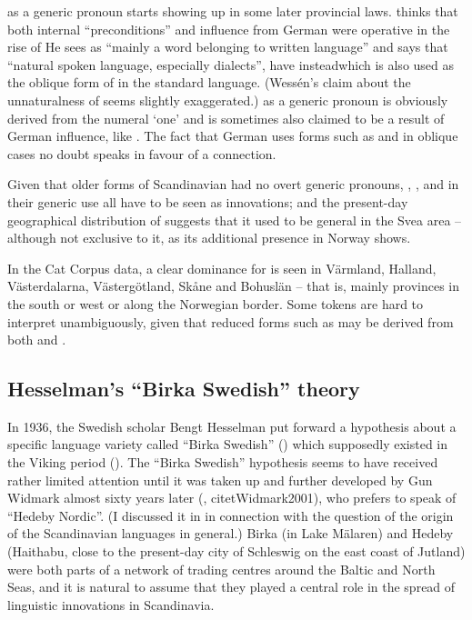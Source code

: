  as a generic pronoun starts showing up in some later provincial laws. \citet[75]{Wessén1956} thinks that both internal “preconditions” and influence from German were operative in the rise of He sees  as “mainly a word belonging to written language” and says that “natural spoken language, especially dialects”, have instead\textstyleLinguisticExample{, }which is also used as the oblique form of  in the standard language. (Wessén’s claim about the unnaturalness of  seems slightly exaggerated.) as a generic pronoun is obviously derived from the numeral ‘one’ and is sometimes also claimed to be a result of German influence, like . The fact that German uses forms such as  and  in oblique cases no doubt speaks in favour of a connection.

Given that older forms of Scandinavian had no overt generic pronouns, , , and  in their generic use all have to be seen as innovations; and the present-day geographical distribution of  suggests that it used to be general in the Svea area – although not exclusive to it, as its additional presence in Norway shows. 

In the Cat Corpus data, a clear dominance for is seen in Värmland, Halland, Västerdalarna, Västergötland, Skåne and Bohuslän – that is, mainly provinces in the south or west or along the Norwegian border. Some tokens are hard to interpret unambiguously, given that reduced forms such as  may be derived from both  and . 

\subsection{Hesselman’s “Birka Swedish” theory}
\label{sec:6.2.5}

In 1936, the Swedish scholar Bengt Hesselman put forward a hypothesis about a specific language variety called “Birka Swedish” () which supposedly existed in the Viking period (\citet{Hesselman1936}). The “Birka Swedish” hypothesis seems to have received rather limited attention until it was taken up and further developed by Gun Widmark almost sixty years later (\citet{Widmark1994}, citet{Widmark2001}), who prefers to speak of “Hedeby Nordic”. (I discussed it in \citet{Dahl2001} in connection with the question of the origin of the Scandinavian languages in general.) Birka (in Lake Mälaren) and Hedeby (Haithabu, close to the present-day city of Schleswig on the east coast of Jutland) were both parts of a network of trading centres around the Baltic and North Seas, and it is natural to assume that they played a central role in the spread of linguistic innovations in Scandinavia. 

